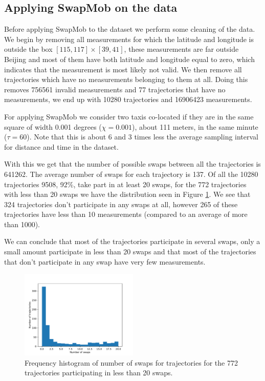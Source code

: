 \documentclass{llncs}
\begin{document}
\subsection{Applying SwapMob on the data}
Before applying SwapMob to the dataset we perform some cleaning of the
data. We begin by removing all measurements for which the latitude and
longitude is outside the box $[115, 117] \times [39, 41]$, these
measurements are far outside Beijing and most of them have both
latitude and longitude equal to zero, which indicates that the
measurement is most likely not valid. We then remove all trajectories
which have no measurements belonging to them at all. Doing this
removes 756561 invalid measurements and 77 trajectories that have no
measurements, we end up with 10280 trajectories and 16906423
measurements.

For applying SwapMob we consider two taxis co-located if they are in
the same square of width 0.001 degrees ($\chi = 0.001$), about 111
meters, in the same minute ($\tau = 60$). Note that this is about 6
and 3 times less the average sampling interval for distance and time
in the dataset.

With this we get that the number of possible swaps between all the
trajectories is 641262. The average number of swaps for each
trajectory is 137. Of all the 10280 trajectories 9508, 92\%, take part
in at least 20 swaps, for the 772 trajectories with less than 20 swaps
we have the distribution seen in Figure \ref{fig:swaps-distribution}.
We see that 324 trajectories don't participate in any swaps at all,
however 265 of these trajectories have less than 10 measurements
(compared to an average of more than 1000).

We can conclude that most of the trajectories participate in several
swaps, only a small amount participate in less than 20 swaps and that
most of the trajectories that don't participate in any swap have very
few measurements.

\begin{figure}
  \center
  \includegraphics[width=0.5\textwidth]{figures/swaps-distribution.pdf}
  \caption{Frequency histogram of number of swaps for trajectories for
    the 772 trajectories participating in less than 20 swaps.}
  \label{fig:swaps-distribution}
\end{figure}
\end{document}
